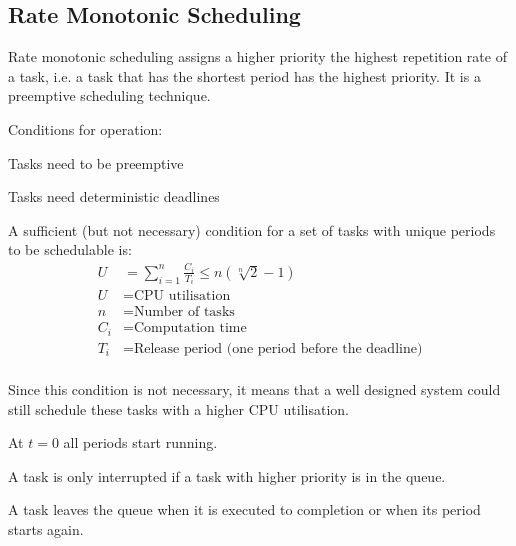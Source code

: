 	\subsection{Rate Monotonic Scheduling}
		Rate monotonic scheduling assigns a higher priority the highest repetition rate of a task, i.e. a task that has the shortest period has the highest priority. It is a preemptive scheduling technique.
		
		Conditions for operation:
		\begin{compactitem}
		  \item Tasks need to be preemptive
		  \item Tasks need deterministic deadlines
		\end{compactitem}
		
		A sufficient (but not necessary) condition for a set of tasks with unique periods to be schedulable is:		
		\begin{equation*}
			\begin{aligned}
				U &= \sum_{i=1}^{n} \frac{C_i}{T_i} \leq n(\sqrt[n]{2}-1)\\
				U &= \text{CPU utilisation}\\
				n &= \text{Number of tasks}\\
				C_{i} &= \text{Computation time} \\
				T_{i} &= \text{Release period (one period before the deadline)}\\
			\end{aligned}
		\end{equation*}
		
		Since this condition is not necessary, it means that a well designed system could still schedule these tasks with a higher CPU utilisation.
		
		\begin{compactitem}
		  \item At $t = 0$ all periods start running.
		  \item A task is only interrupted if a task with higher priority is in the queue.
		  \item A task leaves the queue when it is executed to completion or when its period starts again.
		\end{compactitem}

